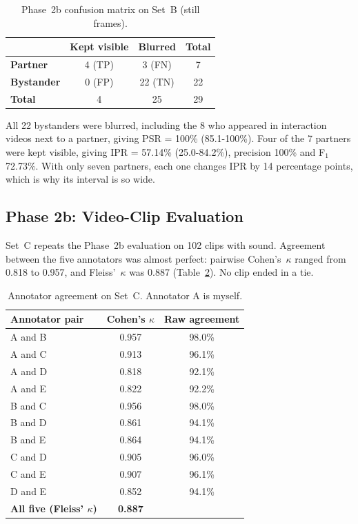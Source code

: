 \begin{table}[htbp]
\begin{singlespace}
\centering
\caption{Phase~2b confusion matrix on Set~B (still frames).}
\label{tab:confusion_2b}
\renewcommand{\arraystretch}{1.3}
\begin{tabular}{@{}lccc@{}}
\toprule
 & \textbf{Kept visible} & \textbf{Blurred} & \textbf{Total} \\
\midrule
\textbf{Partner}   & 4 (TP) & 3 (FN)  & 7 \\
\textbf{Bystander} & 0 (FP) & 22 (TN) & 22 \\
\textbf{Total}     & 4      & 25      & 29 \\
\bottomrule
\end{tabular}
\end{singlespace}
\end{table}

All 22 bystanders were blurred, including the 8 who appeared in interaction videos next
to a partner, giving PSR = 100\% (85.1-100\%). Four of the 7 partners were kept visible,
giving IPR = 57.14\% (25.0-84.2\%), precision 100\% and F$_1$ 72.73\%. With only seven
partners, each one changes IPR by 14 percentage points, which is why its interval is so
wide.

\subsection{Phase 2b: Video-Clip Evaluation}
\label{sec:results_clips}

Set~C repeats the Phase~2b evaluation on 102 clips with sound. Agreement between the five
annotators was almost perfect: pairwise Cohen's~$\kappa$ ranged from 0.818 to 0.957, and
Fleiss'~$\kappa$ was 0.887 (Table~\ref{tab:clip_kappa}). No clip ended in a tie.

\begin{table}[htbp]
\begin{singlespace}
\centering
\caption{Annotator agreement on Set~C. Annotator A is myself.}
\label{tab:clip_kappa}
\renewcommand{\arraystretch}{1.3}
\begin{tabular}{@{}lcc@{}}
\toprule
\textbf{Annotator pair} & \textbf{Cohen's $\kappa$} & \textbf{Raw agreement} \\
\midrule
A and B & 0.957 & 98.0\% \\
A and C & 0.913 & 96.1\% \\
A and D & 0.818 & 92.1\% \\
A and E & 0.822 & 92.2\% \\
B and C & 0.956 & 98.0\% \\
B and D & 0.861 & 94.1\% \\
B and E & 0.864 & 94.1\% \\
C and D & 0.905 & 96.0\% \\
C and E & 0.907 & 96.1\% \\
D and E & 0.852 & 94.1\% \\
\midrule
\textbf{All five (Fleiss' $\kappa$)} & \textbf{0.887} & \\
\bottomrule
\end{tabular}
\end{singlespace}
\end{table}

